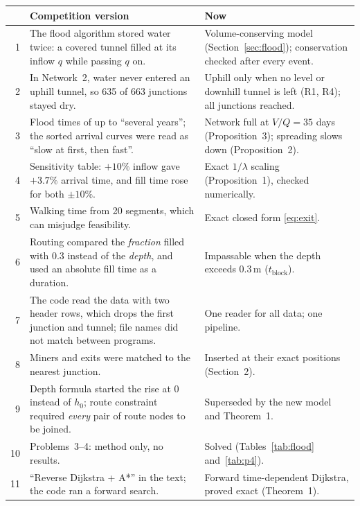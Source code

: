 \documentclass[11pt,a4paper]{article}
\theoremstyle{remark}
\newcommand{\tblock}{t_{\mathrm{block}}}
\begin{document}
{\small
\renewcommand{\arraystretch}{1.25}
\begin{tabularx}{\textwidth}{@{}r >{\raggedright\arraybackslash}X >{\raggedright\arraybackslash}p{3.6cm}@{}}
\toprule
& Competition version & Now\\
\midrule
1 & The flood algorithm stored water twice: a covered tunnel filled at its inflow $q$ while passing $q$ on. & Volume-conserving model (Section~\ref{sec:flood}); conservation checked after every event.\\
2 & In Network~2, water never entered an uphill tunnel, so 635 of 663 junctions stayed dry. & Uphill only when no level or downhill tunnel is left (R1, R4); all junctions reached.\\
3 & Flood times of up to ``several years''; the sorted arrival curves were read as ``slow at first, then fast''. & Network full at $V/Q = 35$ days (Proposition~3); spreading slows down (Proposition~2).\\
4 & Sensitivity table: $+10\%$ inflow gave $+3.7\%$ arrival time, and fill time rose for both $\pm10\%$. & Exact $1/\lambda$ scaling (Proposition~1), checked numerically.\\
5 & Walking time from 20 segments, which can misjudge feasibility. & Exact closed form \eqref{eq:exit}.\\
6 & Routing compared the \emph{fraction} filled with 0.3 instead of the \emph{depth}, and used an absolute fill time as a duration. & Impassable when the depth exceeds 0.3\,m ($\tblock$).\\
7 & The code read the data with two header rows, which drops the first junction and tunnel; file names did not match between programs. & One reader for all data; one pipeline.\\
8 & Miners and exits were matched to the nearest junction. & Inserted at their exact positions (Section~2).\\
9 & Depth formula started the rise at 0 instead of $h_0$; route constraint required \emph{every} pair of route nodes to be joined. & Superseded by the new model and Theorem~1.\\
10 & Problems~3--4: method only, no results. & Solved (Tables~\ref{tab:flood} and~\ref{tab:p4}).\\
11 & ``Reverse Dijkstra + A*'' in the text; the code ran a forward search. & Forward time-dependent Dijkstra, proved exact (Theorem~1).\\
\bottomrule
\end{tabularx}
}
\end{document}
